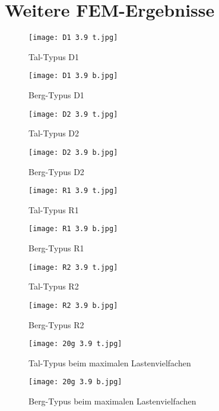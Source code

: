 \chapter{Weitere FEM-Ergebnisse}\label{sec:mehrFEM}


\begin{figure}[h]
	\begin{minipage}[t]{0.5\linewidth}
		\centering
		\texttt{[image: D1 3.9 t.jpg]}
		\caption{Tal-Typus D1}
	\end{minipage}
	\hfill
	\begin{minipage}[t]{0.5\linewidth}
		\centering
		\texttt{[image: D1 3.9 b.jpg]}
		\caption{Berg-Typus D1}
	\end{minipage}
\end{figure}
\begin{figure}[h]
\begin{minipage}[t]{0.5\linewidth}
	\centering
	\texttt{[image: D2 3.9 t.jpg]}
	\caption{Tal-Typus D2}
\end{minipage}
\hfill
\begin{minipage}[t]{0.5\linewidth}
	\centering
	\texttt{[image: D2 3.9 b.jpg]}
	\caption{Berg-Typus D2}
\end{minipage}
\end{figure}
\begin{figure}[h]
\begin{minipage}[t]{0.5\linewidth}
	\centering
	\texttt{[image: R1 3.9 t.jpg]}
	\caption{Tal-Typus R1}
\end{minipage}
\hfill
\begin{minipage}[t]{0.5\linewidth}
	\centering
	\texttt{[image: R1 3.9 b.jpg]}
	\caption{Berg-Typus R1}
\end{minipage}
\end{figure}
%
%
\begin{figure}[h]
\begin{minipage}[t]{0.5\linewidth}
	\centering
	\texttt{[image: R2 3.9 t.jpg]}
	\caption{Tal-Typus R2}
\end{minipage}
\hfill
\begin{minipage}[t]{0.5\linewidth}
	\centering
	\texttt{[image: R2 3.9 b.jpg]}
	\caption{Berg-Typus R2}
\end{minipage}
\end{figure}
\begin{figure}[h]
\begin{minipage}[t]{0.5\linewidth}
	\centering
	\texttt{[image: 20g 3.9 t.jpg]}
	\caption{Tal-Typus beim maximalen Lastenvielfachen}
\end{minipage}
\hfill
\begin{minipage}[t]{0.5\linewidth}
	\centering
	\texttt{[image: 20g 3.9 b.jpg]}
	\caption{Berg-Typus beim maximalen Lastenvielfachen}
\end{minipage}
\end{figure}
